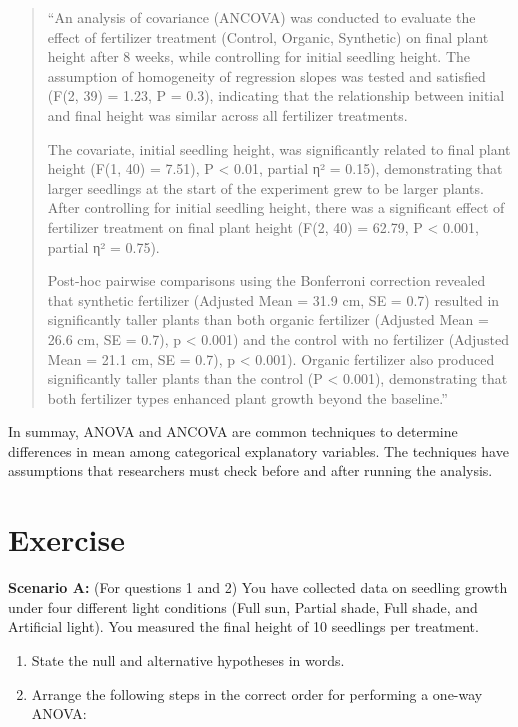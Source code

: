 \documentclass[
]{book}
\begin{document}
\begin{quote}
``An analysis of covariance (ANCOVA) was conducted to evaluate the effect of fertilizer treatment (Control, Organic, Synthetic) on final plant height after 8 weeks, while controlling for initial seedling height. The assumption of homogeneity of regression slopes was tested and satisfied (F(2, 39) = 1.23, P = 0.3), indicating that the relationship between initial and final height was similar across all fertilizer treatments.

The covariate, initial seedling height, was significantly related to final plant height (F(1, 40) = 7.51), P \textless{} 0.01, partial η² = 0.15), demonstrating that larger seedlings at the start of the experiment grew to be larger plants. After controlling for initial seedling height, there was a significant effect of fertilizer treatment on final plant height (F(2, 40) = 62.79, P \textless{} 0.001, partial η² = 0.75).

Post-hoc pairwise comparisons using the Bonferroni correction revealed that synthetic fertilizer (Adjusted Mean = 31.9 cm, SE = 0.7) resulted in significantly taller plants than both organic fertilizer (Adjusted Mean = 26.6 cm, SE = 0.7), p \textless{} 0.001) and the control with no fertilizer (Adjusted Mean = 21.1 cm, SE = 0.7), p \textless{} 0.001). Organic fertilizer also produced significantly taller plants than the control (P \textless{} 0.001), demonstrating that both fertilizer types enhanced plant growth beyond the baseline.''
\end{quote}

In summay, ANOVA and ANCOVA are common techniques to determine differences in mean among categorical explanatory variables. The techniques have assumptions that researchers must check before and after running the analysis.

\section{Exercise}\label{exercise-3}

\textbf{Scenario A:} (For questions 1 and 2)
You have collected data on seedling growth under four different light conditions (Full sun, Partial shade, Full shade, and Artificial light). You measured the final height of 10 seedlings per treatment.

\begin{enumerate}
\def\labelenumi{\arabic{enumi}.}
\item
  State the null and alternative hypotheses in words.
\item
  Arrange the following steps in the correct order for performing a one-way ANOVA:
\end{enumerate}
\end{document}
